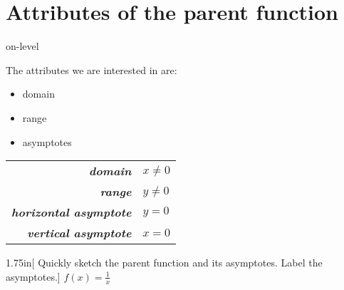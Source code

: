 \section{Attributes of the parent function}

\begin{taggedblock}{on-level}
\begin{minipage}{0.4\textwidth}
    The attributes we are interested in are:
    \vspace{1em}
    \begin{itemize}[nosep]
        \item domain
        \item range
        \item asymptotes
    \end{itemize}
\end{minipage}
\begin{minipage}{0.59\textwidth}
    \begin{myCenteredBox}[width=3.75in,]
        \begin{center}
            {
            \Large
            \begin{tabular}{r|l}
                {\bfseries\itshape domain}     & $x \neq 0 $ \\
                {\bfseries\itshape range}      & $y \neq 0 $ \\
                {\bfseries\itshape horizontal asymptote} & $ y = 0$  \\
                {\bfseries\itshape vertical asymptote} & $ x = 0$  \\
            \end{tabular}
            }
        \end{center}
    \end{myCenteredBox}
\end{minipage}

\begin{myWideProblem}{1.75in}[%
    Quickly sketch the parent function and its asymptotes. Label the asymptotes.]
    {
        $f(x) = \frac{1}{x}$
    }
\end{myWideProblem}

\end{taggedblock}



